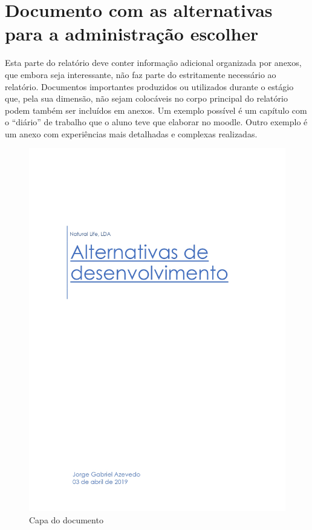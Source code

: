 \chapter{Documento com as alternativas para a administração escolher }
\label{anexo:A}

Esta parte do relatório deve conter informação adicional organizada por anexos, que embora seja interessante, não faz parte do estritamente necessário ao relatório. Documentos importantes produzidos ou utilizados durante o estágio que, pela sua dimensão, não sejam colocáveis no corpo principal do relatório podem também ser incluídos em anexos.
Um exemplo possível é um capítulo com o “diário” de trabalho que o aluno teve que elaborar no moodle. Outro exemplo é um anexo com experiências mais detalhadas e complexas realizadas.

\newpage

\begin{figure}[H]
	\centering
	\includegraphics[width=\linewidth, frame]{figuras/Alternativas/pag0.jpg}
	\caption{Capa do documento}
	\label{fig:anexo_a_capa}
\end{figure}
\newpage

